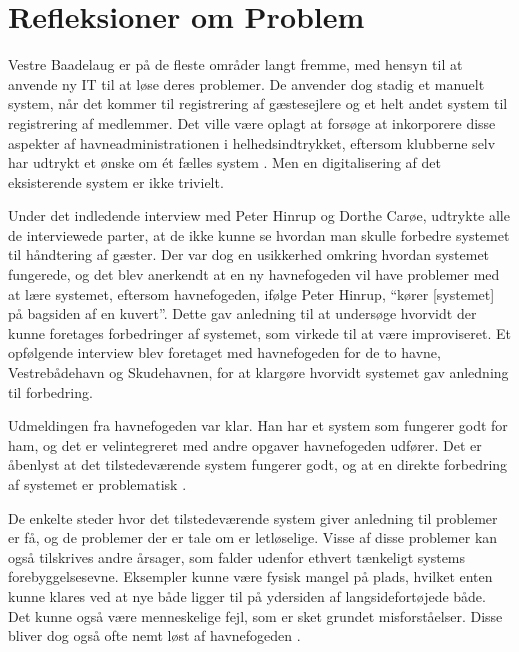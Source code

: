 \section{Refleksioner om Problem}
Vestre Baadelaug er på de fleste områder langt fremme, med hensyn til at anvende ny IT til at løse deres problemer. De anvender dog stadig et manuelt system, når det kommer til registrering af gæstesejlere og et helt andet system til registrering af medlemmer. Det ville være oplagt at forsøge at inkorporere disse aspekter af havneadministrationen i helhedsindtrykket, eftersom klubberne selv har udtrykt et ønske om ét fælles system \cite{int_vb_sl}. Men en digitalisering af det eksisterende system er ikke trivielt.

Under det indledende interview med Peter Hinrup og Dorthe Carøe, udtrykte alle de interviewede parter, at de ikke kunne se hvordan man skulle forbedre systemet til håndtering af gæster. Der var dog en usikkerhed omkring hvordan systemet fungerede, og det blev anerkendt at en ny havnefogeden vil have problemer med at lære systemet, eftersom havnefogeden, ifølge Peter Hinrup, \enquote{kører [systemet] på bagsiden af en kuvert}. Dette gav anledning til at undersøge hvorvidt der kunne foretages forbedringer af systemet, som virkede til at være improviseret. Et opfølgende interview blev foretaget med havnefogeden for de to havne, Vestrebådehavn og Skudehavnen, for at klargøre hvorvidt systemet gav anledning til forbedring.

Udmeldingen fra havnefogeden var klar. Han har et system som fungerer godt for ham, og det er velintegreret med andre opgaver havnefogeden udfører. Det er åbenlyst at det tilstedeværende system fungerer godt, og at en direkte forbedring af systemet er problematisk \cite{int_hf}. 


De enkelte steder hvor det tilstedeværende system giver anledning til problemer er få, og de problemer der er tale om er letløselige. Visse af disse problemer kan også tilskrives andre årsager, som falder udenfor ethvert tænkeligt systems forebyggelsesevne. Eksempler kunne være fysisk mangel på plads, hvilket enten kunne klares ved at nye både ligger til på ydersiden af langsidefortøjede både. Det kunne også være menneskelige fejl, som er sket grundet misforståelser. Disse bliver dog også ofte nemt løst af havnefogeden \cite{int_hf}.

